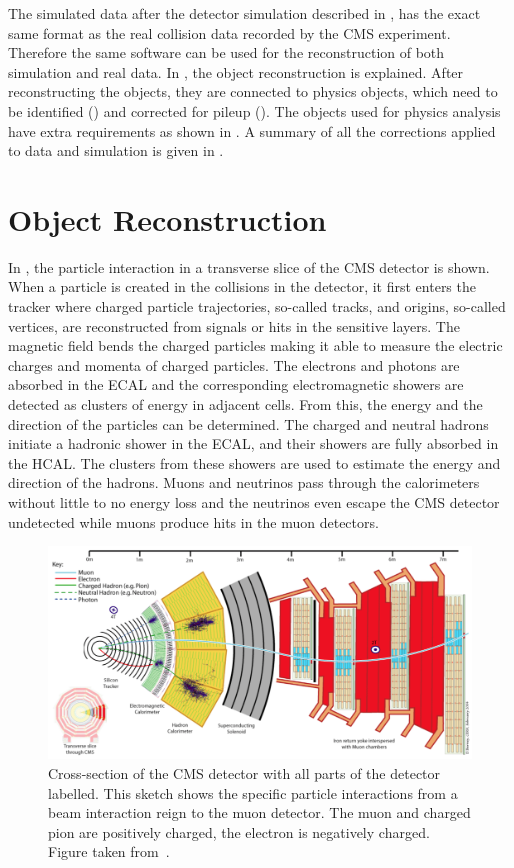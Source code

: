 The simulated data after the detector simulation described in , has the exact same format as the real collision data recorded by the CMS experiment. Therefore the same software can be used for the reconstruction of both simulation and real data. In , the object reconstruction is explained. After reconstructing the objects, they are connected to physics objects, which need to be identified () and corrected for pileup (). The objects used for physics analysis have extra requirements as shown in . A summary of all the corrections applied to data and simulation is given in .

\section{Object Reconstruction}
\label{sec:reco}
In , the particle interaction in a transverse slice of the CMS detector is shown. When a particle is created in the collisions in the detector, it first enters the tracker where charged particle trajectories, so-called tracks, and origins, so-called vertices, are reconstructed from signals or hits in the sensitive layers. The  magnetic field bends the charged particles making it able to measure the electric charges and momenta of charged particles. The electrons and photons are absorbed in the ECAL and the corresponding electromagnetic showers are detected as clusters of energy in adjacent cells. From this, the energy and the direction of the particles can be determined. The charged and neutral hadrons initiate a hadronic shower in the ECAL, and their showers are fully absorbed in the HCAL. The clusters from these showers are used to estimate the energy and direction of the hadrons. Muons and neutrinos pass through the calorimeters without little to no energy loss and the neutrinos even escape the CMS detector undetected while muons produce hits in the muon detectors. 
\begin{landscape}
\begin{figure}
	\centering
	\includegraphics[width=1.\linewidth]{4_EventRecoSelect/Figures/transversecms}
	\caption{Cross-section of the CMS detector with all parts of the detector labelled. This sketch shows the specific particle interactions from a beam interaction reign to the muon detector. The muon and charged pion are positively charged, the electron is negatively charged. Figure taken from~\cite{CMS-PRF-14-001}. }
	\label{fig:transversecms}
\end{figure}
\end{landscape}
